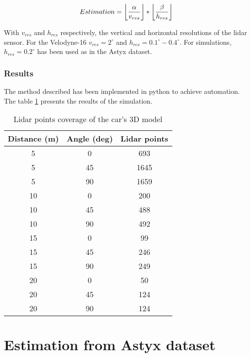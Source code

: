 \documentclass{scrartcl}
\newcommand{\floor}[1]{\left\lfloor #1 \right\rfloor}
\begin{document}
  \begin{equation}
    \centering
    Estimation = \floor{\frac{\alpha}{v_{res}}} * \floor{\frac{\beta}{h_{res}}}
    \label{equation:lidar-point-estimation}
  \end{equation}

  With $v_{res}$ and $h_{res}$ respectively, the vertical and horizontal
  resolutions of the lidar sensor. For the Velodyne-16 $v_{res} = 2^{\circ}$
  and $h_{res} = 0.1^{\circ} - 0.4^{\circ}$. For simulations,
  $h_{res} = 0.2^{\circ}$ has been used as in the Astyx dataset.


  \subsubsection{Results}

  The method described has been implemented in python to achieve automation.
  The table \ref{table:3D-mode-lidar-coverage} presents the results of the simulation.

  \begin{table}[!htbp]
    \centering
    \caption{Lidar points coverage of the car's 3D model}
    \begin{tabular}{ | c | c | c |}
      \hline
      \textbf{Distance (m)} & \textbf{Angle (deg)} & \textbf{Lidar points} \\
      \hline \hline
      5 & 0 & 693 \\
      \hline
      5 & 45 & 1645 \\
      \hline
      5 & 90 & 1659 \\
      \hline
      10 & 0 & 200 \\
      \hline
      10 & 45 & 488 \\
      \hline
      10 & 90 & 492 \\
      \hline
      15 & 0 & 99 \\
      \hline
      15 & 45 & 246 \\
      \hline
      15 & 90 & 249 \\
      \hline
      20 & 0 & 50 \\
      \hline
      20 & 45 & 124 \\
      \hline
      20 & 90 & 124 \\
      \hline
    \end{tabular}
    \label{table:3D-mode-lidar-coverage}
  \end{table}

  \section{Estimation from Astyx dataset}
\end{document}
